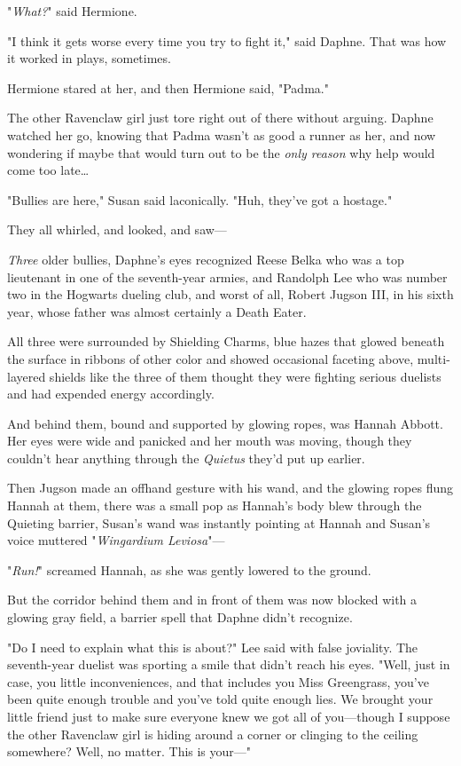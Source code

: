 "\emph{What?}" said Hermione.

"I think it gets worse every time you try to fight it," said Daphne. That was 
how it worked in plays, sometimes.

Hermione stared at her, and then Hermione said, "Padma."

The other Ravenclaw girl just tore right out of there without arguing. Daphne 
watched her go, knowing that Padma wasn't as good a runner as her, and now 
wondering if maybe that would turn out to be the \emph{only reason} why help 
would come too late{\ldots}

"Bullies are here," Susan said laconically. "Huh, they've got a hostage."

They all whirled, and looked, and saw---

\emph{Three} older bullies, Daphne's eyes recognized Reese Belka who was a top 
lieutenant in one of the seventh-year armies, and Randolph Lee who was number 
two in the Hogwarts dueling club, and worst of all, Robert Jugson III, in his 
sixth year, whose father was almost certainly a Death Eater.

All three were surrounded by Shielding Charms, blue hazes that glowed beneath 
the surface in ribbons of other color and showed occasional faceting above, 
multi-layered shields like the three of them thought they were fighting serious 
duelists and had expended energy accordingly.

And behind them, bound and supported by glowing ropes, was Hannah Abbott. Her 
eyes were wide and panicked and her mouth was moving, though they couldn't hear 
anything through the \emph{Quietus} they'd put up earlier.

Then Jugson made an offhand gesture with his wand, and the glowing ropes flung 
Hannah at them, there was a small pop as Hannah's body blew through the 
Quieting barrier, Susan's wand was instantly pointing at Hannah and Susan's 
voice muttered "\emph{Wingardium Leviosa}"---

"\emph{Run!}" screamed Hannah, as she was gently lowered to the ground.

But the corridor behind them and in front of them was now blocked with a 
glowing gray field, a barrier spell that Daphne didn't recognize.

"Do I need to explain what this is about?" Lee said with false joviality. The 
seventh-year duelist was sporting a smile that didn't reach his eyes. "Well, 
just in case, you little inconveniences, and that includes you Miss Greengrass, 
you've been quite enough trouble and you've told quite enough lies. We brought 
your little friend just to make sure everyone knew we got all of you---though I 
suppose the other Ravenclaw girl is hiding around a corner or clinging to the 
ceiling somewhere? Well, no matter. This is your---"

